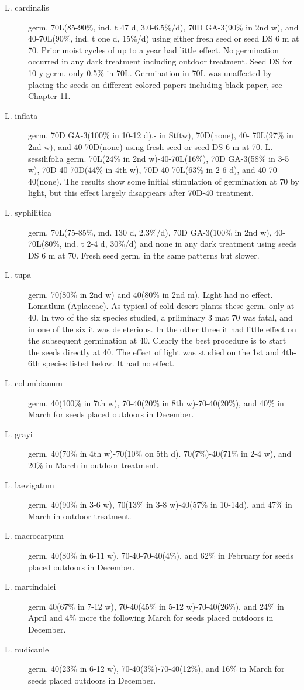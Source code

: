 \begin{description}
\item[L. cardinalis] germ. 70L(85-90\%, ind. t 47 d, 3.0-6.5\%/d), 70D GA-3(90\% in 2nd
w), and 40-70L(90\%, ind. t one d, 15\%/d) using either fresh seed or seed DS 6 m at
70. Prior moist cycles of up to a year had little effect. No germination occurred in any
dark treatment including outdoor treatment. Seed DS for 10 y germ. only 0.5\% in 70L.
Germination in 70L was unaffected by placing the seeds on different colored papers
including black paper, see Chapter 11.
\item[L. inflata] germ. 70D GA-3(100\% in 10-12 d),- in Stftw), 70D(none), 40-
70L(97\% in 2nd w), and 40-70D(none) using fresh seed or seed DS 6 m at 70.
L. sessilifolia germ. 70L(24\% in 2nd w)-40-70L(16\%), 70D GA-3(58\% in 3-5 w),
70D-40-70D(44\% in 4th w), 70D-40-70L(63\% in 2-6 d), and 40-70-40(none). The
results show some initial stimulation of germination at 70 by light, but this effect largely
disappears after 70D-40 treatment.
\item[L. syphilitica] germ. 70L(75-85\%, md. 130 d, 2.3\%/d), 70D GA-3(100\% in 2nd w),
40-70L(80\%, ind. t 2-4 d, 30\%/d) and none in any dark treatment using seeds DS 6 m
at 70. Fresh seed germ. in the same patterns but slower.
\item[L. tupa] germ. 70(80\% in 2nd w) and 40(80\% in 2nd m). Light had no effect.
Lomatlum (Aplaceae). As typical of cold desert plants these germ. only at
40. In two of the six species studied, a prliminary 3 mat 70 was fatal, and in one of the
six it was deleterious. In the other three it had little effect on the subsequent
germination at 40. Clearly the best procedure is to start the seeds directly at 40. The
effect of light was studied on the 1st and 4th-6th species listed below. It had no effect.

\item[L. columbianum] germ. 40(100\% in 7th w), 70-40(20\% in 8th w)-70-40(20\%),
and 40\% in March for seeds placed outdoors in December.
\item[L. grayi] germ. 40(70\% in 4th w)-70(10\% on 5th d). 70(7\%)-40(71\% in 2-4 w),
and 20\% in March in outdoor treatment.
\item[L. laevigatum] germ. 40(90\% in 3-6 w), 70(13\% in 3-8 w)-40(57\% in 10-14d),
and 47\% in March in outdoor treatment.
\item[L. macrocarpum] germ. 40(80\% in 6-11 w), 70-40-70-40(4\%), and 62\% in
February for seeds placed outdoors in December.
\item[L. martindalei] germ 40(67\% in 7-12 w), 70-40(45\% in 5-12 w)-70-40(26\%), and
24\% in April and 4\% more the following March for seeds placed outdoors in
December.
\item[L. nudicaule] germ. 40(23\% in 6-12 w), 70-40(3\%)-70-40(12\%), and 16\% in
March for seeds placed outdoors in December.


\end{description}
